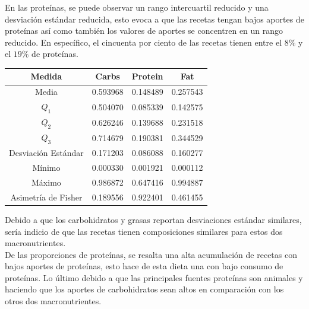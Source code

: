 \documentclass[12pt,a4paper]{article}
\begin{document}
            En las proteínas, se puede observar un rango intercuartil reducido y una 
            desviación estándar reducida, esto evoca a que las recetas tengan bajos 
            aportes de proteínas así como también los valores de aportes se concentren 
            en un rango reducido. En específico, el cincuenta por ciento de las recetas 
            tienen entre el $8\%$ y el $19\%$ de proteínas.

            \begin{center}
                \begin{tabular}{|c|ccc|}
                    \hline
                    Medida & Carbs & Protein & Fat \\
                    \hline
                    Media               & 0.593968 & 0.148489 & 0.257543  \\
                    $Q_1$               & 0.504070 & 0.085339 & 0.142575  \\
                    $Q_2$               & 0.626246 & 0.139688 & 0.231518  \\
                    $Q_3$               & 0.714679 & 0.190381 & 0.344529  \\
                    Desviación Estándar & 0.171203 & 0.086088 & 0.160277  \\
                    Mínimo              & 0.000330 & 0.001921 & 0.000112  \\
                    Máximo              & 0.986872 & 0.647416 & 0.994887  \\
                    Asimetría de Fisher & 0.189556 & 0.922401 & 0.461455  \\
                    \hline
                \end{tabular}
            \end{center}

            Debido a que los carbohidratos y grasas reportan desviaciones estándar 
            similares, sería indicio de que las recetas tienen composiciones similares 
            para estos dos macronutrientes.\\

            De las proporciones de proteínas, se resalta una alta acumulación de 
            recetas con bajos aportes de proteínas, esto hace de esta dieta una 
            con bajo consumo de proteínas. Lo último debido a que las principales 
            fuentes proteínas son animales y haciendo que los aportes de carbohidratos 
            sean altos en comparación con los otros dos macronutrientes.
\end{document}
